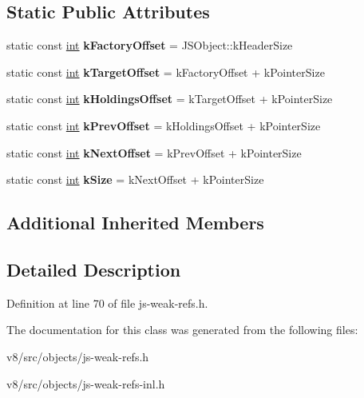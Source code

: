 \subsection*{Static Public Attributes}
\begin{DoxyCompactItemize}
\item 
\mbox{\label{classv8_1_1internal_1_1JSWeakCell_ad5f213bf16793c5447751dc212a1e14f}} 
static const \mbox{\hyperlink{classint}{int}} {\bfseries k\+Factory\+Offset} = J\+S\+Object\+::k\+Header\+Size
\item 
\mbox{\label{classv8_1_1internal_1_1JSWeakCell_ae799c5736352319d97b7f439ef616494}} 
static const \mbox{\hyperlink{classint}{int}} {\bfseries k\+Target\+Offset} = k\+Factory\+Offset + k\+Pointer\+Size
\item 
\mbox{\label{classv8_1_1internal_1_1JSWeakCell_a61aafa20edfe3f861a1fa5c7cbd4e843}} 
static const \mbox{\hyperlink{classint}{int}} {\bfseries k\+Holdings\+Offset} = k\+Target\+Offset + k\+Pointer\+Size
\item 
\mbox{\label{classv8_1_1internal_1_1JSWeakCell_a9e782739f10a635a36056ae15fe2310b}} 
static const \mbox{\hyperlink{classint}{int}} {\bfseries k\+Prev\+Offset} = k\+Holdings\+Offset + k\+Pointer\+Size
\item 
\mbox{\label{classv8_1_1internal_1_1JSWeakCell_a0b9a8e8f6ba150450bfe8f1e97702cab}} 
static const \mbox{\hyperlink{classint}{int}} {\bfseries k\+Next\+Offset} = k\+Prev\+Offset + k\+Pointer\+Size
\item 
\mbox{\label{classv8_1_1internal_1_1JSWeakCell_a8284d9909991e13058c25b47fc070713}} 
static const \mbox{\hyperlink{classint}{int}} {\bfseries k\+Size} = k\+Next\+Offset + k\+Pointer\+Size
\end{DoxyCompactItemize}
\subsection*{Additional Inherited Members}


\subsection{Detailed Description}


Definition at line 70 of file js-\/weak-\/refs.\+h.



The documentation for this class was generated from the following files\+:\begin{DoxyCompactItemize}
\item 
v8/src/objects/js-\/weak-\/refs.\+h\item 
v8/src/objects/js-\/weak-\/refs-\/inl.\+h\end{DoxyCompactItemize}
